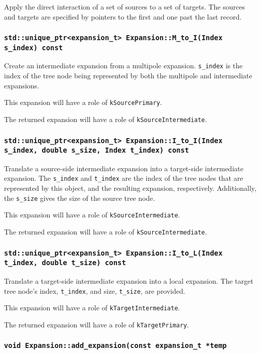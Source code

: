 Apply the direct interaction of a set of sources to a set of targets. The
sources and targets are specified by pointers to the first and one past the
last record.

\subsubsection{\texttt{std::unique\_ptr<expansion\_t> Expansion::M\_to\_I(Index s\_index) const}}

Create an intermediate expansion from a multipole expansion. \texttt{s\_index}
is the index of the tree node being represented by both the multipole and
intermediate expansions.

This expansion will have a role of \texttt{kSourcePrimary}.

The returned expansion will have a role of \texttt{kSourceIntermediate}.

\subsubsection{\texttt{std::unique\_ptr<expansion\_t> Expansion::I\_to\_I(Index s\_index, double s\_size, Index t\_index) const}}

Translate a source-side intermediate expansion into a target-side intermediate
expansion. The \texttt{s\_index} and \texttt{t\_index} are the index of the
tree nodes that are represented by this object, and the resulting expansion,
respectively. Additionally, the \texttt{s\_size} gives the size of the source
tree node.

This expansion will have a role of \texttt{kSourceIntermediate}.

The returned expansion will have a role of \texttt{kSourceIntermediate}.

\subsubsection{\texttt{std::unique\_ptr<expansion\_t> Expansion::I\_to\_L(Index t\_index, double t\_size) const}}

Translate a target-side intermediate expansion into a local expansion. The
target tree node's index, \texttt{t\_index}, and size, \texttt{t\_size},
are provided.

This expansion will have a role of \texttt{kTargetIntermediate}.

The returned expansion will have a role of \texttt{kTargetPrimary}.

\subsubsection{\texttt{void Expansion::add\_expansion(const expansion\_t *temp}}

